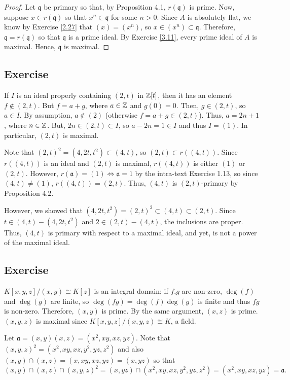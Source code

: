 \begin{proof}
Let $\mathfrak{q}$ be primary so that, by Proposition 4.1, $r(\mathfrak{q})$ is prime. Now, suppose $x \in r(\mathfrak{q})$ so that $x^n \in \mathfrak{q}$ for some $n > 0$. Since $A$
is absolutely flat, we know by Exercise \ref{2.27} that $(x) = (x^n)$, so $x \in (x^n) \subset \mathfrak{q}$. Therefore, $\mathfrak{q} = r(\mathfrak{q})$ so that $\mathfrak{q}$ is a prime ideal. 
By Exercise \ref{3.11}, every prime ideal of $A$ is maximal. Hence, $\mathfrak{q}$ is maximal.
\end{proof}

\subsection{Exercise}\label{4.4}

If $I$ is an ideal properly containing $(2,t)$ in $\mathbb{Z}[t]$, then it has an element $f \not\in (2,t)$. But $f = a + g$, where $a \in \mathbb{Z}$ and $g(0) = 0$. Then, $g \in (2,t)$, so
$a \in I$. By assumption, $a \not\in (2)$ (otherwise $f = a + g \in (2,t)$). Thus, $a = 2n + 1$, where $n \in \mathbb{Z}$. But, $2n \in (2,t) \subset I$, so $a - 2n = 1 \in I$ and thus $I=(1)$.
In particular, $(2,t)$ is maximal.

Note that $(2,t)^2 = (4,2t,t^2) \subset (4,t)$, so $(2,t) \subset r((4,t))$. Since $r((4,t))$ is an ideal and $(2,t)$ is maximal, $r((4,t))$ is either $(1)$ or $(2,t)$. However, 
$r(\mathfrak{a}) = (1) \iff \mathfrak{a} = 1$ by the intra-text Exercise 1.13, so since $(4,t) \neq (1)$, $r((4,t)) = (2,t)$. Thus, $(4,t)$ is $(2,t)$-primary by Proposition 4.2.

However, we showed that $(4,2t,t^2) = (2,t)^2 \subset (4,t) \subset (2,t)$. Since $t \in (4,t) - (4,2t,t^2)$ and $2 \in (2,t) - (4,t)$, the inclusions are proper. Thus, $(4,t)$ is primary
with respect to a maximal ideal, and yet, is not a power of the maximal ideal.

\subsection{Exercise}\label{4.5}

$K[x,y,z]/(x,y) \cong K[z]$ is an integral domain; if $f$,$g$ are non-zero, $\deg(f)$ and $\deg(g)$ are finite, so $\deg(fg) = \deg(f)\deg(g)$ is finite and thus $fg$ is non-zero. 
Therefore, $(x,y)$ is prime. By the same argument, $(x,z)$ is prime. $(x,y,z)$ is maximal since $K[x,y,z]/(x,y,z) \cong K$, a field.

Let $\mathfrak{a} = (x,y)(x,z) = (x^2, xy, xz, yz)$. Note that $(x,y,z)^2 = (x^2,xy,xz,y^2,yz,z^2)$ and also $(x,y) \cap (x,z) = (x,xy,xz,yz) = (x,yz)$ so that
$$(x,y) \cap (x,z) \cap (x,y,z)^2 = (x,yz) \cap (x^2,xy,xz,y^2,yz,z^2) = (x^2,xy,xz,yz) = \mathfrak{a}.$$

